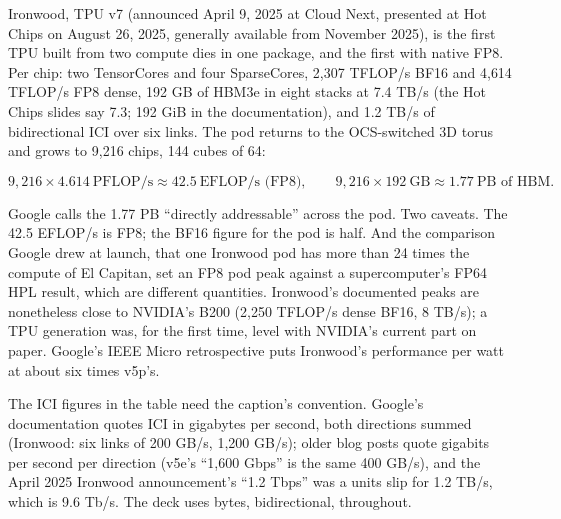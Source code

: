 \documentclass[11pt,letterpaper]{article}
\newenvironment{formulas}{\begin{tcolorbox}[formulabox]}{\end{tcolorbox}}
\begin{document}
Ironwood, TPU v7 (announced April 9, 2025 at Cloud Next, presented at Hot Chips on August 26, 2025, generally available from November 2025), is the first TPU built from two compute dies in one package, and the first with native FP8. Per chip: two TensorCores and four SparseCores, 2{,}307 TFLOP/s BF16 and 4{,}614 TFLOP/s FP8 dense, 192 GB of HBM3e in eight stacks at 7.4 TB/s (the Hot Chips slides say 7.3; 192 GiB in the documentation), and 1.2 TB/s of bidirectional ICI over six links. The pod returns to the OCS-switched 3D torus and grows to 9{,}216 chips, 144 cubes of 64:
\begin{formulas}
\[
9{,}216 \times 4.614\ \text{PFLOP/s} \approx 42.5\ \text{EFLOP/s (FP8)},\qquad
9{,}216 \times 192\ \text{GB} \approx 1.77\ \text{PB of HBM}.
\]
\end{formulas}
Google calls the 1.77 PB ``directly addressable'' across the pod. Two caveats. The 42.5 EFLOP/s is FP8; the BF16 figure for the pod is half. And the comparison Google drew at launch, that one Ironwood pod has more than 24 times the compute of El Capitan, set an FP8 pod peak against a supercomputer's FP64 HPL result, which are different quantities. Ironwood's documented peaks are nonetheless close to NVIDIA's B200 (2{,}250 TFLOP/s dense BF16, 8 TB/s); a TPU generation was, for the first time, level with NVIDIA's current part on paper. Google's IEEE Micro retrospective puts Ironwood's performance per watt at about six times v5p's.

The ICI figures in the table need the caption's convention. Google's documentation quotes ICI in gigabytes per second, both directions summed (Ironwood: six links of 200 GB/s, 1{,}200 GB/s); older blog posts quote gigabits per second per direction (v5e's ``1,600 Gbps'' is the same 400 GB/s), and the April 2025 Ironwood announcement's ``1.2 Tbps'' was a units slip for 1.2 TB/s, which is 9.6 Tb/s. The deck uses bytes, bidirectional, throughout.
\end{document}
